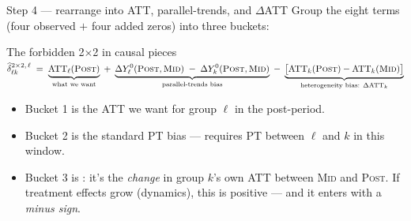 \documentclass[aspectratio=169,11pt]{beamer}
\begin{document}
\begin{frame}{Step 4 --- rearrange into ATT, parallel-trends, and $\Delta$ATT}
\vspace{0.3em}
Group the eight terms (four observed $+$ four added zeros) into three buckets:
\vspace{0.4em}

\begin{block}{The forbidden 2$\times$2 in causal pieces}
\small
\centering
$\widehat{\delta}^{2\times 2,\,\ell}_{\ell k} \;=\; \underbrace{\text{ATT}_\ell(\textsc{Post})}_{\text{what we want}} \;+\; \underbrace{\Delta Y^0_\ell(\textsc{Post},\textsc{Mid}) \;-\; \Delta Y^0_k(\textsc{Post},\textsc{Mid})}_{\text{parallel-trends bias}} \;-\; \underbrace{\big[\text{ATT}_k(\textsc{Post}) - \text{ATT}_k(\textsc{Mid})\big]}_{\text{heterogeneity bias: }\Delta\text{ATT}_k}$
\end{block}

\vspace{0.6em}
\begin{itemize}\small
  \item Bucket 1 is the ATT we want for group $\ell$ in the post-period.
  \item Bucket 2 is the standard PT bias --- requires PT between $\ell$ and $k$ in this window.
  \item Bucket 3 is : it's the \textit{change} in group $k$'s own ATT between \textsc{Mid} and \textsc{Post}. \;If treatment effects grow (dynamics), this is positive --- and it enters with a \textit{minus sign}.
\end{itemize}
\end{frame}
\end{document}
